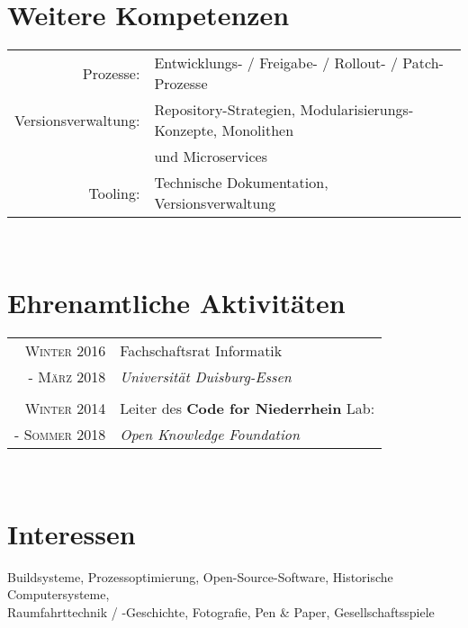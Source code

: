 \documentclass[10pt,a4paper]{article}
\begin{document}
\section{Weitere Kompetenzen}

\begin{tabular}{rl}
	Prozesse:				& Entwicklungs- / Freigabe- / Rollout- / Patch-Prozesse \\
	Versionsverwaltung:		& Repository-Strategien, Modularisierungs-Konzepte, Monolithen \\
						& und Microservices \\
	Tooling:				& Technische Dokumentation, Versionsverwaltung \\
\end{tabular} \\


\section{Ehrenamtliche Aktivit\"aten}

\begin{tabular}{rl}
	\textsc{Winter} 2016		& Fachschaftsrat Informatik \\
	- \textsc{M\"arz} 2018	& \emph{Universit\"at Duisburg-Essen} \\
	& \\
	
	\textsc{Winter} 2014		& Leiter des \textbf{Code for Niederrhein} Lab: \\
	- \textsc{Sommer} 2018	& \emph{Open Knowledge Foundation} \\
\end{tabular} \\


\section{Interessen}
Buildsysteme, Prozessoptimierung, Open-Source-Software, Historische Computersysteme, \\
Raumfahrttechnik / -Geschichte, Fotografie, Pen \& Paper, Gesellschaftsspiele
\end{document}
